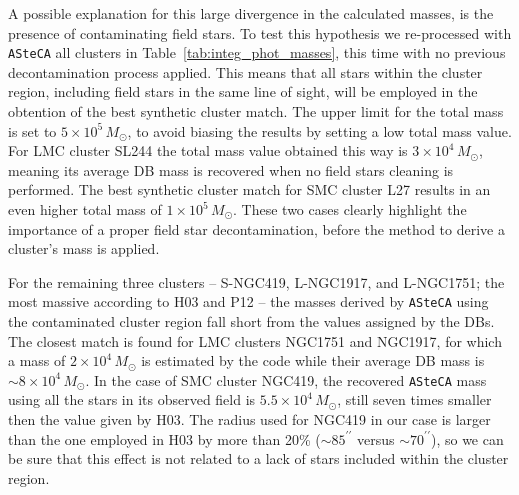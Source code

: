 \documentclass[draft]{aa}
\begin{document}
A possible explanation for this large divergence in the calculated masses, is
the presence of contaminating field stars.
To test this hypothesis we re-processed with \texttt{ASteCA} all clusters in
Table~\ref{tab:integ_phot_masses}, this time with no previous decontamination
process applied. This means that all stars within the cluster region, including
field stars in the same line of sight, will be employed in the obtention of 
the best synthetic cluster match. The upper limit for the total mass is set to
$5{\times}10^5\,M_{\odot}$, to avoid biasing the results by setting a low total
mass value.
%
For LMC cluster SL244 the total mass value obtained this way is
$3{\times}10^4\,M_{\odot}$, meaning its average DB mass is recovered when no
field stars cleaning is performed.
The best synthetic cluster match for SMC cluster L27 results in an even higher
total mass of $1{\times}10^5\,M_{\odot}$. These two cases clearly highlight the
importance of a proper field star decontamination, before the method to derive a
cluster's mass is applied.

For the remaining three clusters -- S-NGC419, L-NGC1917, and L-NGC1751; the most
massive according to H03 and P12 -- the masses derived by \texttt{ASteCA} using
the contaminated cluster region fall short from the values assigned by the DBs.
The closest match is found for LMC clusters NGC1751 and NGC1917, for which a
mass of $2{\times}10^4\,M_{\odot}$ is estimated by the code while their average
DB mass is ${\sim}8{\times}10^4\,M_{\odot}$.
In the case of SMC cluster NGC419, the recovered \texttt{ASteCA} mass using all
the stars in its observed field is $5.5{\times}10^4\,M_{\odot}$, still
seven times smaller then the value given by H03. The radius used for NGC419 in
our case is larger than the one employed in H03 by more than 20\%
(${\sim}85^{\prime\prime}$ versus ${\sim}70^{\prime\prime}$), so we can be sure
that this effect is not related to a lack of stars included within the cluster
region.
\end{document}
